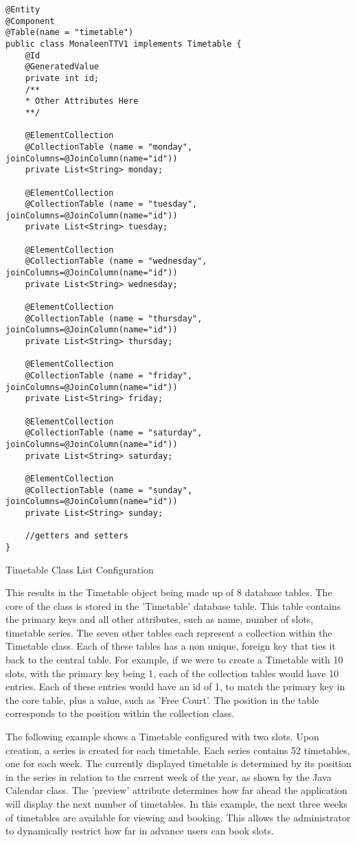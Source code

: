 \begin{table}[H]
\begin{lstlisting}
@Entity
@Component
@Table(name = "timetable")
public class MonaleenTTV1 implements Timetable {
	@Id
	@GeneratedValue
	private int id;
	/**
	* Other Attributes Here
	**/
	
	@ElementCollection
	@CollectionTable (name = "monday", joinColumns=@JoinColumn(name="id"))
	private List<String> monday;
	
	@ElementCollection
	@CollectionTable (name = "tuesday", joinColumns=@JoinColumn(name="id"))
	private List<String> tuesday;
	
	@ElementCollection
	@CollectionTable (name = "wednesday", joinColumns=@JoinColumn(name="id"))
	private List<String> wednesday;
	
	@ElementCollection
	@CollectionTable (name = "thursday", joinColumns=@JoinColumn(name="id"))
	private List<String> thursday;
	
	@ElementCollection
	@CollectionTable (name = "friday", joinColumns=@JoinColumn(name="id"))
	private List<String> friday;
	
	@ElementCollection
	@CollectionTable (name = "saturday", joinColumns=@JoinColumn(name="id"))
	private List<String> saturday;
	
	@ElementCollection
	@CollectionTable (name = "sunday", joinColumns=@JoinColumn(name="id"))
	private List<String> sunday;
	
	//getters and setters
}
\end{lstlisting}
\caption{Timetable Class List Configuration}
\end{table}

This results in the Timetable object being made up of 8 database tables. The core of the class is stored in the 'Timetable' database table. This table contains the primary keys and all other attributes, such as name, number of slots, timetable series. The seven other tables each represent a collection within the Timetable class. Each of these tables has a non unique, foreign key that ties it back to the central table. For example, if we were to create a Timetable with 10 slots, with the primary key being 1, each of the collection tables would have 10 entries. Each of these entries would have an id of 1, to match the primary key in the core table, plus a value, such as 'Free Court'. The position in the table corresponds to the position within the collection class. 

The following example shows a Timetable configured with two slots. Upon creation, a series is created for each timetable. Each series contains 52 timetables, one for each week. The currently displayed timetable is determined by its position in the series in relation to the current week of the year, as shown by the Java Calendar class. The 'preview' attribute determines how far ahead the application will display the next number of timetables. In this example, the next three weeks of timetables are available for viewing and booking. This allows the administrator to dynamically restrict how far in advance users can book slots.

